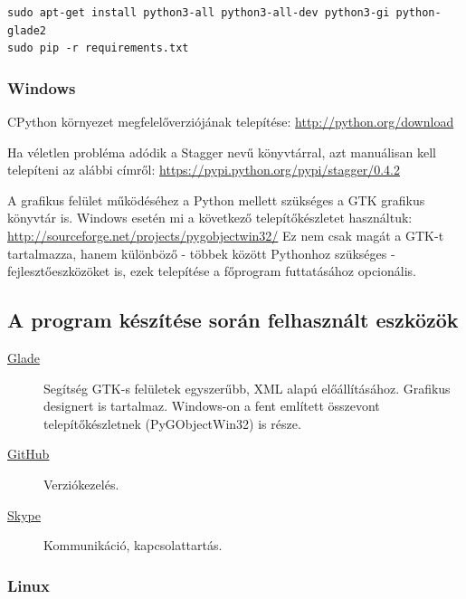 \begin{lstlisting}[label={lst:install}, caption=Telepítés Linux környezetben,breaklines=true]
sudo apt-get install python3-all python3-all-dev python3-gi python-glade2
sudo pip -r requirements.txt
\end{lstlisting}


\subsubsection{Windows}
\label{ssub:windows}

CPython környezet megfelelőverziójának telepítése: \url{http://python.org/download}

Ha véletlen probléma adódik a Stagger nevű könyvtárral, azt manuálisan kell telepíteni az alábbi címről: \url{https://pypi.python.org/pypi/stagger/0.4.2}

A grafikus felület működéséhez a Python mellett szükséges a GTK grafikus könyvtár is. Windows esetén mi a következő telepítőkészletet használtuk:
\url{http://sourceforge.net/projects/pygobjectwin32/}
Ez nem csak magát a GTK-t tartalmazza, hanem különböző  - többek között Pythonhoz szükséges - fejlesztőeszközöket is, ezek telepítése a főprogram futtatásához opcionális.



\subsection{A program készítése során felhasznált eszközök}
\label{sub:aprogramkeszitesesoranfelhasznalt}

\begin{description}
	\item[\href{https://glade.gnome.org/}{Glade}] Segítség GTK-s felületek egyszerűbb, XML alapú előállításához. Grafikus designert is tartalmaz. Windows-on a fent említett összevont telepítőkészletnek (PyGObjectWin32) is része.
	\item[\href{https://github.com/}{GitHub}] Verziókezelés.
	\item[\href{http://www.skype.com/hu/}{Skype}] Kommunikáció, kapcsolattartás.
\end{description}

\subsubsection{Linux}
\label{ssub:linux}


